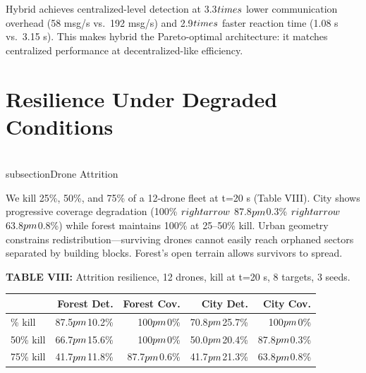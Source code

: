 \documentclass[conference]{IEEEtran}
\begin{document}
Hybrid achieves centralized-level detection at 3.3$\\times$ lower communication
overhead (58 msg/s vs.~192 msg/s) and 2.9$\\times$ faster reaction time (1.08 s
vs.~3.15 s). This makes hybrid the Pareto-optimal architecture: it
matches centralized performance at decentralized-like efficiency.

\section{Resilience Under Degraded Conditions}\label{vi.-resilience-under-degraded-conditions}

\\subsection{Drone Attrition}\label{a.-drone-attrition}

We kill 25\%, 50\%, and 75\% of a 12-drone fleet at t=20 s (Table VIII).
City shows progressive coverage degradation (100\% $\\rightarrow$ 87.8$\\pm$0.3\% $\\rightarrow$
63.8$\\pm$0.8\%) while forest maintains 100\% at 25--50\% kill. Urban
geometry constrains redistribution---surviving drones cannot easily
reach orphaned sectors separated by building blocks. Forest's open
terrain allows survivors to spread.

\textbf{TABLE VIII:} Attrition resilience, 12 drones, kill at t=20 s, 8
targets, 3 seeds.

{\def\LTcaptype{none} %
\begin{longtable}[]{@{}lrrrr@{}}
\toprule\noalign{}
& Forest Det. & Forest Cov. & City Det. & City Cov. \\
\midrule\noalign{}
\endhead
\bottomrule\noalign{}
\endlastfoot
25\% kill & 87.5$\\pm$10.2\% & 100$\\pm$0\% & 70.8$\\pm$25.7\% & 100$\\pm$0\% \\
50\% kill & 66.7$\\pm$15.6\% & 100$\\pm$0\% & 50.0$\\pm$20.4\% & 87.8$\\pm$0.3\% \\
75\% kill & 41.7$\\pm$11.8\% & 87.7$\\pm$0.6\% & 41.7$\\pm$21.3\% & 63.8$\\pm$0.8\% \\
\end{longtable}
}
\end{document}
